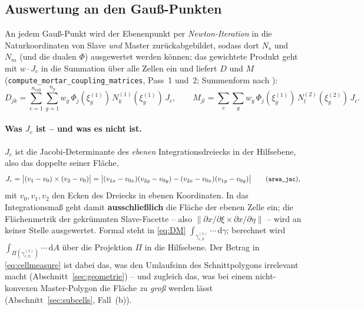 \documentclass[a4paper,11pt]{article}
\def\bm#1{#1}%
\newcommand{\code}[1]{\texttt{\small #1}}
\begin{document}
\subsection{Auswertung an den Gauß-Punkten}
An jedem Gauß-Punkt wird der Ebenenpunkt per \emph{Newton-Iteration} in die Naturkoordinaten von
Slave \emph{und} Master zurückabgebildet, sodass dort $N_s$ und $N_m$ (und die dualen $\Phi$)
ausgewertet werden können; das gewichtete Produkt geht mit $w\cdot J_c$ in die Summation über alle
Zellen ein und liefert $\bm D$ und $\bm M$ (\code{compute\_mortar\_coupling\_matrices}, Pass~1 und~2;
Summenform nach \citealt[Alg.~1, S.~215]{farah2015}):
\begin{equation}
D_{jk} = \sum_{c=1}^{n_{\text{cell}}}\sum_{g=1}^{n_g} w_g\,
\Phi_j(\bm\xi_g^{(1)})\,N_k^{(1)}(\bm\xi_g^{(1)})\,J_c,
\qquad
M_{jl} = \sum_{c}\sum_{g} w_g\,
\Phi_j(\bm\xi_g^{(1)})\,N_l^{(2)}(\bm\xi_g^{(2)})\,J_c .
\label{eq:DMquad}
\end{equation}

\paragraph{Was $J_c$ ist -- und was es nicht ist.}
$J_c$ ist die Jacobi-Determinante des \emph{ebenen} Integrationsdreiecks in der Hilfsebene, also das
doppelte seiner Fläche,
\begin{equation}
J_c = \big|(\bm v_1-\bm v_0)\times(\bm v_2-\bm v_0)\big|
    = \big|(v_{1x}-v_{0x})(v_{2y}-v_{0y})-(v_{2x}-v_{0x})(v_{1y}-v_{0y})\big|
\qquad (\code{area\_jac}),
\label{eq:cellmeasure}
\end{equation}
mit $\bm v_0,\bm v_1,\bm v_2$ den Ecken des Dreiecks in ebenen Koordinaten. In das Integrationsmaß
geht damit \textbf{ausschließlich} die Fläche der ebenen Zelle ein; die Flächenmetrik der
gekrümmten Slave-Facette -- also $\|\partial\bm x/\partial\xi\times\partial\bm x/\partial\eta\|$ --
wird an keiner Stelle ausgewertet. Formal steht in \eqref{eq:DM} $\int_{\gamma_{c,h}^{(1)}}\!\cdots\,
\mathrm d\gamma$; berechnet wird
$\int_{\Pi(\gamma_{c,h}^{(1)})}\!\cdots\,\mathrm dA$ über die Projektion $\Pi$ in die Hilfsebene.
Der Betrag in \eqref{eq:cellmeasure} ist dabei das, was den Umlaufsinn des Schnittpolygons
irrelevant macht (Abschnitt~\ref{sec:geometrie}) -- und zugleich das, was bei einem nicht-konvexen
Master-Polygon die Fläche \emph{zu groß} werden lässt (Abschnitt~\ref{sec:subcells}, Fall~(b)).
\end{document}
